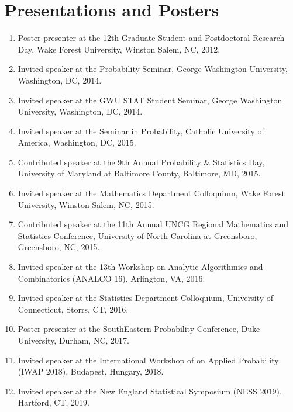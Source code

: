 \documentclass[12pt]{article}
\begin{document}
	\section*{Presentations and Posters}
	\begin{enumerate}
		\item Poster presenter at the 12th Graduate Student and Postdoctoral Research Day, Wake Forest University, Winston Salem, NC, 2012.
		
		\item Invited speaker at the Probability Seminar, George Washington University, Washington, DC, 2014.
		
		\item Invited speaker at the GWU STAT Student Seminar, George Washington University, Washington, DC, 2014.
		
		\item Invited speaker at the Seminar in Probability, Catholic University of America, Washington, DC, 2015.
		
		\item Contributed speaker at the 9th Annual Probability \& Statistics Day, University of Maryland at Baltimore County, Baltimore, MD, 2015.
		
		\item Invited speaker at the Mathematics Department Colloquium, Wake Forest University, Winston-Salem, NC, 2015. 
		
		\item Contributed speaker at the 11th Annual UNCG Regional Mathematics and Statistics Conference, University of North Carolina at Greensboro, Greensboro, NC, 2015.
		
		\item Invited speaker at the 13th Workshop on Analytic Algorithmics and Combinatorics (ANALCO 16), Arlington, VA, 2016.
		
		\item Invited speaker at the Statistics Department Colloquium, University of Connecticut, Storrs, CT, 2016.
		
		\item Poster presenter at the SouthEastern Probability Conference, Duke University, Durham, NC, 2017.
		
		\item Invited speaker at the International Workshop of on 
		Applied Probability (IWAP 2018), Budapest, Hungary, 2018.
		
		\item Invited speaker at the New England Statistical Symposium (NESS 2019), Hartford, CT, 2019.
		

\end{enumerate}
\end{document}
